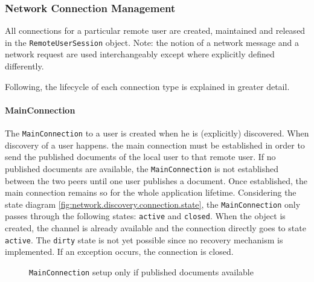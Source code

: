 \subsubsection{Network Connection Management}
All connections for a particular remote user are created, maintained and released in the \texttt{RemoteUserSession} object. Note: the notion of a network message and a network request are used interchangeably except where explicitly defined differently.

Following, the lifecycle of each connection type is explained in greater detail.

\paragraph{MainConnection}
The \texttt{MainConnection} to a user is created when he is (explicitly) discovered. When discovery of a user happens. the main connection must be established in order to send the published documents of the local user to that remote user. If no published documents are available, the \texttt{MainConnection} is not established between the two peers until one user publishes a document. Once established, the main connection remains so for the whole application lifetime. Considering the state diagram \ref{fig:network.discovery.connection.state}, the \texttt{MainConnection} only passes through the following states: \texttt{active} and \texttt{closed}. When the object is created, the channel is already available and the connection directly goes to state  \texttt{active}. The \texttt{dirty} state is not yet possible since no recovery mechanism is implemented. If an exception occurs, the connection is closed.

\begin{figure}[H]
 \centering
 \caption{\texttt{MainConnection} setup only if published documents available}
 \label{fig:network.protocol.mainconnectionsetup}
\end{figure}

